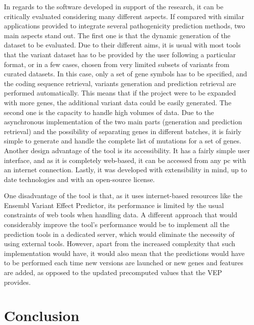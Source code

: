 \documentclass[12pt,MSc,wordcount,anon]{muthesis}
\begin{document}
\begin{flushleft}
In regards to the software developed in support of the research, it can be critically evaluated considering many different aspects. If compared with similar applications provided to integrate several pathogenicity prediction methods, two main aspects stand out. The first one is that the dynamic generation of the dataset to be evaluated. Due to their different aims, it is usual with most tools that the variant dataset has to be provided by the user following a particular format, or in a few cases, chosen from very limited subsets of variants from curated datasets. In this case, only a set of gene symbols has to be specified, and the coding sequence retrieval, variants generation and prediction retrieval are performed automatically. This means that if the project were to be expanded with more genes, the additional variant data could be easily generated. The second one is the capacity to handle high volumes of data. Due to the asynchronous implementation of the two main parts (generation and prediction retrieval) and the  possibility of separating genes in different batches, it is fairly simple to generate and handle the complete list of mutations for a set of genes. Another design advantage of the tool is its accessibility. It has a fairly simple user interface, and as it is completely web-based, it can be accessed from any pc with an internet connection. Lastly, it was developed with extensibility in mind, up to date technologies and with an open-source license.

One disadvantage of the tool is that, as it uses internet-based resources like the Ensembl Variant Effect Predictor, its performance is limited by the usual constraints of web tools when handling data. A different approach that would considerably improve the tool's performance would be to implement all the prediction tools in a dedicated server, which would eliminate the necessity of using external tools. However, apart from the increased complexity that such implementation would have, it would also mean that the predictions would have to be performed each time new versions are launched or new genes and features are added, as opposed to the updated precomputed values that the VEP provides.

\chapter{Conclusion}
\label{cha:conclusion}


\end{flushleft}
\end{document}
